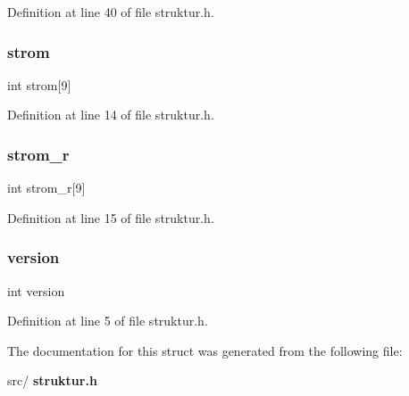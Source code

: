 Definition at line 40 of file struktur.\+h.

\mbox{\label{structramp1_aa227e499727289d28e63cb23a5c59390}} 
\subsubsection{strom}
{\footnotesize\ttfamily int strom[9]}



Definition at line 14 of file struktur.\+h.

\mbox{\label{structramp1_a7511bb1a3eda7ee09ef65fcf4e3407c1}} 
\subsubsection{strom\+\_\+r}
{\footnotesize\ttfamily int strom\+\_\+r[9]}



Definition at line 15 of file struktur.\+h.

\mbox{\label{structramp1_aad880fc4455c253781e8968f2239d56f}} 
\subsubsection{version}
{\footnotesize\ttfamily int version}



Definition at line 5 of file struktur.\+h.



The documentation for this struct was generated from the following file\+:\begin{DoxyCompactItemize}
\item 
src/\textbf{ struktur.\+h}\end{DoxyCompactItemize}
